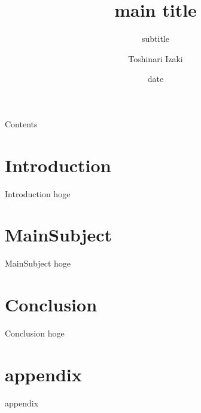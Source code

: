 \documentclass[aspectratio=169, dvipdfmx, 12pt]{beamer}
\title[title]{main title}
\subtitle{subtitle}
\author{Toshinari Izaki}
\institute{University of Hyogo}
\date{date}
\begin{document}
\maketitle


\begin{frame}{Contents}
\tableofcontents

\end{frame}

\section{Introduction}
\begin{frame}{Introduction}
    hoge
\end{frame}

\section{MainSubject}
\begin{frame}{MainSubject}
    hoge
\end{frame}

\section{Conclusion}
\begin{frame}{Conclusion}
    hoge
\end{frame}



\appendix
\section{appendix}
\begin{frame}{appendix}
\end{frame}
\end{document}
